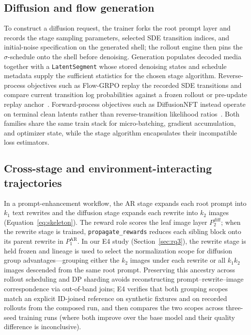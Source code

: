 \documentclass[10pt]{article}
\begin{document}
\subsection{Diffusion and flow generation}

To construct a diffusion request, the trainer forks the root prompt layer and records the stage sampling parameters, selected SDE transition indices, and initial-noise specification on the generated shell; the rollout engine then pins the $\sigma$-schedule onto the shell before denoising.
Generation populates decoded media together with a \texttt{LatentSegment} whose stored denoising states and schedule metadata supply the sufficient statistics for the chosen stage algorithm.
Reverse-process objectives such as Flow-GRPO replay the recorded SDE transitions and compare current transition log probabilities against a frozen rollout or pre-update replay anchor~\citep{liu2025flowgrpo}.
Forward-process objectives such as DiffusionNFT instead operate on terminal clean latents rather than reverse-transition likelihood ratios~\citep{zheng2025diffusionnft}.
Both families share the same train stack for micro-batching, gradient accumulation, and optimizer state, while the stage algorithm encapsulates their incompatible loss estimators.

\subsection{Cross-stage and environment-interacting trajectories}

In a prompt-enhancement workflow, the AR stage expands each root prompt into $k_1$ text rewrites and the diffusion stage expands each rewrite into $k_2$ images (Equation~\ref{eq:skeleton}).
The reward role scores the leaf image layer $P_2^{\mathrm{diff}}$; when the rewrite stage is trained, \texttt{propagate\_rewards} reduces each sibling block onto its parent rewrite in $P_1^{\mathrm{AR}}$.
In our E4 study (Section~\ref{sec:rq3}), the rewrite stage is held frozen and lineage is used to select the normalization scope for diffusion group advantages---grouping either the $k_2$ images under each rewrite or all $k_1 k_2$ images descended from the same root prompt.
Preserving this ancestry across rollout scheduling and DP sharding avoids reconstructing prompt--rewrite--image correspondence via out-of-band joins; E4 verifies that both grouping scopes match an explicit ID-joined reference on synthetic fixtures and on recorded rollouts from the composed run, and then compares the two scopes across three-seed training runs (where both improve over the base model and their quality difference is inconclusive).
\end{document}
